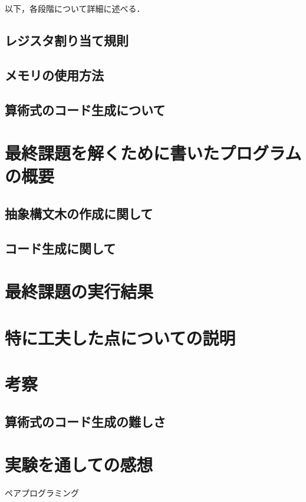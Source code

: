 \documentclass[a4j]{jarticle}
\begin{document}
以下，各段階について詳細に述べる．

\subsection{レジスタ割り当て規則}

\subsection{メモリの使用方法}

\subsection{算術式のコード生成について}

\section{最終課題を解くために書いたプログラムの概要}

\subsection{抽象構文木の作成に関して}

\subsection{コード生成に関して}


\section{最終課題の実行結果}

\section{特に工夫した点についての説明}



\section{考察}
\subsection{算術式のコード生成の難しさ}

\section{実験を通しての感想}
ペアプログラミング
\end{document}
